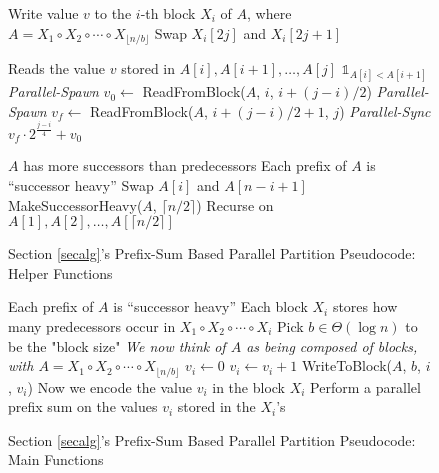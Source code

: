 \documentclass[sigplan, 10pt, nonacm]{acmart}
\theoremstyle{remark}
\theoremstyle{remark}
\begin{document}
\begin{appendices}
\begin{figure*}
  \caption{Section \ref{secalg}'s Prefix-Sum Based Parallel Partition Pseudocode: Helper Functions}
	\label{alg:parallelPartition}
  \begin{algorithmic} %
     \Comment Write value $v$ to the $i$-th block $X_i$ of $A$, where $A = X_1 \circ X_2 \circ \cdots \circ X_{\lfloor n/b \rfloor}$
          \State Swap $X_i[2j]$ and $X_i[2j+1]$
        \EndIf
      \EndFor
    \EndProcedure
    \State

     \Comment Reads the value $v$ stored in $A[i], A[i+1], \ldots, A[j]$
        \State \Return $\mathds{1}_{A[i] < A[i+1]}$
      \Else
        \State \emph{Parallel-Spawn} $v_0 \gets $ ReadFromBlock($A$, $i$, $i+(j-i)/2$)
        \State \emph{Parallel-Spawn} $v_f \gets $ ReadFromBlock($A$, $i+(j-i)/2+1$, $j$)
        \State \emph{Parallel-Sync}
        \State \Return $v_f\cdot 2^\frac{j-i}{4} + v_0$
      \EndIf
    \EndProcedure
    \State

    \Require $A$ has more successors than predecessors
    \Ensure Each prefix of $A$ is ``successor heavy''
          \State Swap $A[i]$ and $A[n-i+1]$
        \EndIf
      \EndFor
      \State MakeSuccessorHeavy($A$, $\lceil n/2 \rceil$)
      \Comment Recurse on $A[1],A[2], \ldots, A[\lceil n/2 \rceil]$
    \EndProcedure
	\end{algorithmic}	
\end{figure*}

\begin{figure*}
  \caption{Section \ref{secalg}'s Prefix-Sum Based Parallel Partition Pseudocode: Main Functions}
	\label{alg:parallelPartition}
  \begin{algorithmic} %
    \Require Each prefix of $A$ is ``successor heavy''
    \Ensure Each block $X_i$ stores how many predecessors occur in $X_1 \circ X_2 \circ \cdots \circ X_i$
      \State Pick $b \in \Theta(\log n)$ to be the "block size"
      \Comment \emph{We now think of $A$ as being composed of blocks, with $A = X_1 \circ X_2 \circ \cdots \circ X_{\lfloor n/b \rfloor}$}
        \State $v_i \gets 0$  
            \State $v_i \gets v_i + 1$
          \EndIf
        \EndFor
        \State WriteToBlock($A$, $b$, $i$, $v_i$)
        \Comment Now we encode the value $v_i$ in the block $X_i$
      \EndFor
      \State Perform a parallel prefix sum on the values $v_i$ stored in the $X_i$'s
   \EndProcedure
    \State


\end{algorithmic}
\end{figure*}
\end{appendices}
\end{document}
